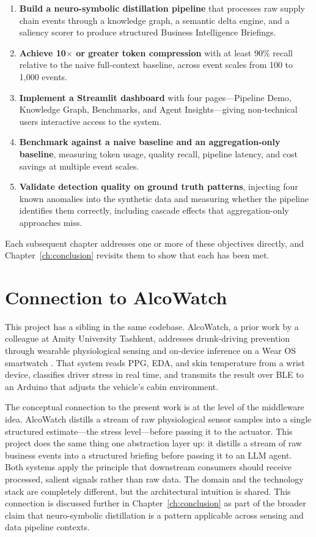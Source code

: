 \begin{enumerate}
  \item \textbf{Build a neuro-symbolic distillation pipeline} that processes raw supply chain
  events through a knowledge graph, a semantic delta engine, and a saliency scorer to produce
  structured Business Intelligence Briefings.

  \item \textbf{Achieve 10$\times$ or greater token compression} with at least 90\% recall
  relative to the naive full-context baseline, across event scales from 100 to 1,000 events.

  \item \textbf{Implement a Streamlit dashboard} with four pages---Pipeline Demo, Knowledge
  Graph, Benchmarks, and Agent Insights---giving non-technical users interactive access to
  the system.

  \item \textbf{Benchmark against a naive baseline and an aggregation-only baseline},
  measuring token usage, quality recall, pipeline latency, and cost savings at multiple
  event scales.

  \item \textbf{Validate detection quality on ground truth patterns}, injecting four known
  anomalies into the synthetic data and measuring whether the pipeline identifies them
  correctly, including cascade effects that aggregation-only approaches miss.
\end{enumerate}

Each subsequent chapter addresses one or more of these objectives directly, and
Chapter~\ref{ch:conclusion} revisits them to show that each has been met.

\section{Connection to AlcoWatch}
\label{sec:alcowatch}

This project has a sibling in the same codebase. AlcoWatch, a prior work by a colleague
at Amity University Tashkent, addresses drunk-driving prevention through wearable
physiological sensing and on-device inference on a Wear OS smartwatch
\citep{shaposhnikova2025alcowatch}. That system reads PPG, EDA, and skin temperature from
a wrist device, classifies driver stress in real time, and transmits the result over BLE
to an Arduino that adjusts the vehicle's cabin environment.

The conceptual connection to the present work is at the level of the middleware idea.
AlcoWatch distills a stream of raw physiological sensor samples into a single structured
estimate---the stress level---before passing it to the actuator. This project does the
same thing one abstraction layer up: it distills a stream of raw business events into a
structured briefing before passing it to an LLM agent. Both systems apply the principle
that downstream consumers should receive processed, salient signals rather than raw data.
The domain and the technology stack are completely different, but the architectural intuition
is shared. This connection is discussed further in Chapter~\ref{ch:conclusion} as part of
the broader claim that neuro-symbolic distillation is a pattern applicable across sensing
and data pipeline contexts.

